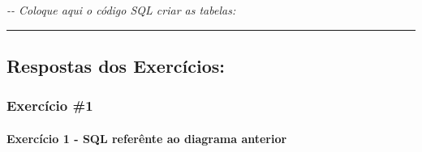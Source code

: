 \documentclass[
]{book}
\makeatletter
\newenvironment{Shaded}{\begin{snugshade}}{\end{snugshade}}
\newcommand{\CommentTok}[1]{\textcolor[rgb]{0.56,0.35,0.01}{\textit{#1}}}
\newcommand*\pandocbounded[1]{%
  \sbox\pandoc@box{#1}%
  \Gscale@div\@tempa{\textheight}{\dimexpr\ht\pandoc@box+\dp\pandoc@box\relax}%
  \Gscale@div\@tempb{\linewidth}{\wd\pandoc@box}%
  \ifdim\@tempb\p@<\@tempa\p@\let\@tempa\@tempb\fi%
  \ifdim\@tempa\p@<\p@\scalebox{\@tempa}{\usebox\pandoc@box}%
  \else\usebox{\pandoc@box}%
  \fi%
}
\makeatother
\begin{document}
\pandocbounded{}

\begin{Shaded}
\begin{Highlighting}[]
\CommentTok{{-}{-} Coloque aqui o código SQL criar as tabelas:}
\end{Highlighting}
\end{Shaded}

\begin{center}\rule{0.5\linewidth}{0.5pt}\end{center}

\subsection{Respostas dos Exercícios:}\label{respostas-dos-exercuxedcios-1}

\subsubsection{Exercício \#1}\label{exercuxedcio-1-1}

\pandocbounded{}

\paragraph{Exercício 1 - SQL referênte ao diagrama anterior}\label{exercuxedcio-1---sql-referuxeante-ao-diagrama-anterior}
\end{document}

